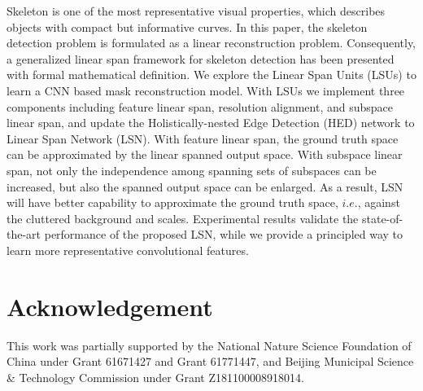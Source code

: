 \documentclass[runningheads]{llncs}
\begin{document}
Skeleton is one of the most representative visual properties, which describes objects with compact but informative curves. In this paper, the skeleton detection problem is formulated as a linear reconstruction problem. Consequently, a generalized linear span framework for skeleton detection has been presented with formal mathematical definition. We explore the Linear Span Units (LSUs) to learn a CNN based mask reconstruction model. With LSUs we implement three components including feature linear span, resolution alignment, and subspace linear span, and update the Holistically-nested Edge Detection (HED) network to Linear Span Network (LSN). With feature linear span, the ground truth space can be approximated by the linear spanned output space. With subspace linear span, not only the independence among spanning sets of subspaces can be increased, but also the spanned output space can be enlarged. As a result, LSN will have better capability to approximate the ground truth space, $i.e.$, against the cluttered background and scales. Experimental results validate the state-of-the-art performance of the proposed LSN, while we provide a principled way to learn more representative convolutional features.
\section*{Acknowledgement}
This work was partially supported by the National Nature Science Foundation of China under Grant 61671427 and Grant 61771447, and Beijing Municipal Science \& Technology Commission under Grant Z181100008918014.
%


\end{document}
